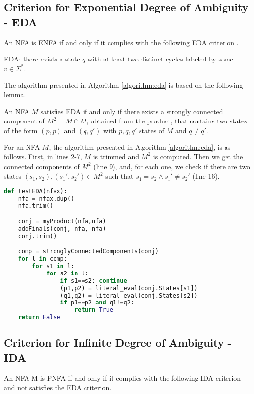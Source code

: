 \subsection{Criterion for Exponential Degree of Ambiguity - EDA}
An NFA is ENFA if and only if it complies with the following EDA criterion \cite{Seidl89}.

EDA: there exists a state $q$ with at least two distinct cycles labeled by some $v \in \Sigma^*$.

The algorithm presented in Algorithm \ref{algorithm:eda} is based on the following lemma.

\begin{lemma} \textbf{\cite{AllauzenMR11}}
An NFA $M$ satisfies EDA if and only if there exists a strongly connected component of $M^2 = M \cap M$, obtained from the product, that contains two states of the form $(p,p)$ and $(q,q')$ with $p,q,q'$ states of $M$ and $q \neq q'$.
\end{lemma}

For an NFA $M$, the algorithm presented in Algorithm \ref{algorithm:eda}, is as follows. First, in lines 2-7, $M$ is trimmed and $M^2$ is computed.
Then we get the connected components of $M^2$ (line 9), and, for each one, we check if there are two states $(s_1,s_2),(s_1',s_2') \in M^2$ such that $s_1 = s_2 \land s_1' \neq s_2'$ (line 16).

\begin{lstlisting}[language=Python, caption = Algorithm to test EDA criterion, label={algorithm:eda}]
def testEDA(nfax):
    nfa = nfax.dup()
    nfa.trim()

    conj = myProduct(nfa,nfa)
    addFinals(conj, nfa, nfa)
    conj.trim()

    comp = stronglyConnectedComponents(conj)
    for l in comp:
        for s1 in l:
            for s2 in l:
                if s1==s2: continue
                (p1,p2) = literal_eval(conj.States[s1])
                (q1,q2) = literal_eval(conj.States[s2])
                if p1==p2 and q1!=q2:
                    return True
    return False
\end{lstlisting}

\subsection{Criterion for Infinite Degree of Ambiguity - IDA}
An NFA M is PNFA if and only if it complies with the following IDA criterion \cite{Seidl89} and not satisfies the EDA criterion.

